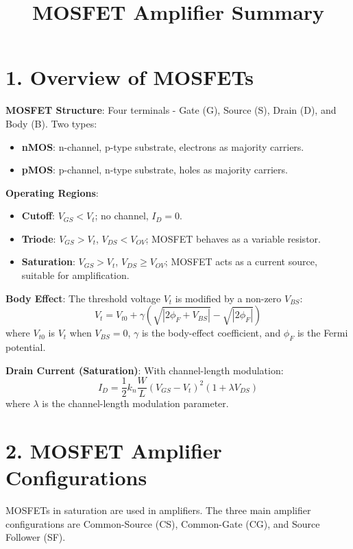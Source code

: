 \documentclass[10pt]{article}
\begin{document}
\small

\title{\vspace{-1cm} \textbf{MOSFET Amplifier Summary}}
\date{}
\maketitle

\begin{multicols}{2}
\section*{1. Overview of MOSFETs}
\textbf{MOSFET Structure}: Four terminals - Gate (G), Source (S), Drain (D), and Body (B). Two types:
\begin{itemize}[noitemsep]
    \item \textbf{nMOS}: n-channel, p-type substrate, electrons as majority carriers.
    \item \textbf{pMOS}: p-channel, n-type substrate, holes as majority carriers.
\end{itemize}
\textbf{Operating Regions}:
\begin{itemize}[noitemsep]
    \item \textbf{Cutoff}: \(V_{GS} < V_t\); no channel, \(I_D = 0\).
    \item \textbf{Triode}: \(V_{GS} > V_t\), \(V_{DS} < V_{OV}\); MOSFET behaves as a variable resistor.
    \item \textbf{Saturation}: \(V_{GS} > V_t\), \(V_{DS} \geq V_{OV}\); MOSFET acts as a current source, suitable for amplification.
\end{itemize}

\textbf{Body Effect}: The threshold voltage \(V_t\) is modified by a non-zero \(V_{BS}\):
\[
V_t = V_{t0} + \gamma (\sqrt{|2\phi_F + V_{BS}|} - \sqrt{|2\phi_F|})
\]
where \(V_{t0}\) is \(V_t\) when \(V_{BS} = 0\), \(\gamma\) is the body-effect coefficient, and \(\phi_F\) is the Fermi potential.

\textbf{Drain Current (Saturation)}: With channel-length modulation:
\[
I_D = \frac{1}{2} k_n \frac{W}{L} (V_{GS} - V_t)^2 (1 + \lambda V_{DS})
\]
where \(\lambda\) is the channel-length modulation parameter.

\section*{2. MOSFET Amplifier Configurations}
MOSFETs in saturation are used in amplifiers. The three main amplifier configurations are Common-Source (CS), Common-Gate (CG), and Source Follower (SF).


\end{multicols}
\end{document}
